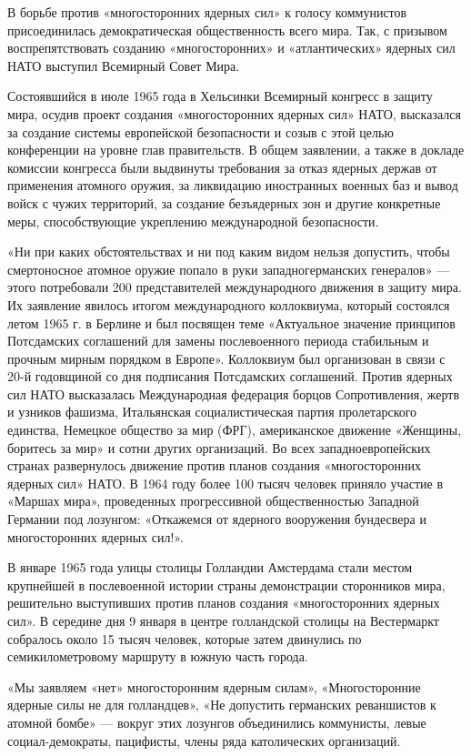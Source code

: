 \documentclass[12pt, a4paper, openany]{book}
\begin{document}
	
	В борьбе против «многосторонних ядерных сил» к голосу коммунистов присоединилась демократическая общественность всего мира. Так, с призывом воспрепятствовать созданию «многосторонних» и «атлантических» ядерных сил НАТО выступил Всемирный Совет Мира.
	
	Состоявшийся в июле 1965 года в Хельсинки Всемирный конгресс в защиту мира, осудив проект создания «многосторонних ядерных сил» НАТО, высказался за создание системы европейской безопасности и созыв с этой целью конференции на уровне глав правительств. В общем заявлении, а также в докладе комиссии конгресса были выдвинуты требования за отказ ядерных держав от применения атомного оружия, за ликвидацию иностранных военных баз и вывод войск с чужих территорий, за создание безъядерных зон и другие конкретные меры, способствующие укреплению международной безопасности.
	
	«Ни при каких обстоятельствах и ни под каким видом нельзя допустить, чтобы смертоносное атомное оружие попало в руки западногерманских генералов» — этого потребовали 200 представителей международного движения в защиту мира. Их заявление явилось итогом международного коллоквиума, который состоялся летом 1965 г. в Берлине и был посвящен теме «Актуальное значение принципов Потсдамских соглашений для замены послевоенного периода стабильным и прочным мирным порядком в Европе». Коллоквиум был организован в связи с 20-й годовщиной со дня подписания Потсдамских соглашений. Против ядерных сил НАТО высказалась Международная федерация борцов Сопротивления, жертв и узников фашизма, Итальянская социалистическая партия пролетарского единства, Немецкое общество за мир (ФРГ), американское движение «Женщины, боритесь за мир» и сотни других организаций. Во всех западноевропейских странах развернулось движение против планов создания «многосторонних ядерных сил» НАТО. В 1964 году более 100 тысяч человек приняло участие в «Маршах мира», проведенных прогрессивной общественностью Западной Германии под лозунгом: «Откажемся от ядерного вооружения бундесвера и многосторонних ядерных сил!».
	
	В январе 1965 года улицы столицы Голландии Амстердама стали местом крупнейшей в послевоенной истории страны демонстрации сторонников мира, решительно выступивших против планов создания «многосторонних ядерных сил». В середине дня 9 января в центре голландской столицы на Вестермаркт собралось около 15 тысяч человек, которые затем двинулись по семикилометровому маршруту в южную часть города. 
	
	«Мы заявляем «нет» многосторонним ядерным силам», «Многосторонние ядерные силы не для голландцев», «Не допустить германских реваншистов к атомной бомбе» — вокруг этих лозунгов объединились коммунисты, левые социал-демократы, пацифисты, члены ряда католических организаций.
	
\end{document}
